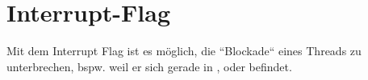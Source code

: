 \section{Interrupt-Flag}

Mit dem Interrupt Flag ist es möglich, die ``Blockade`` eines Threads zu unterbrechen, bspw. weil er sich gerade in ,  oder  befindet.